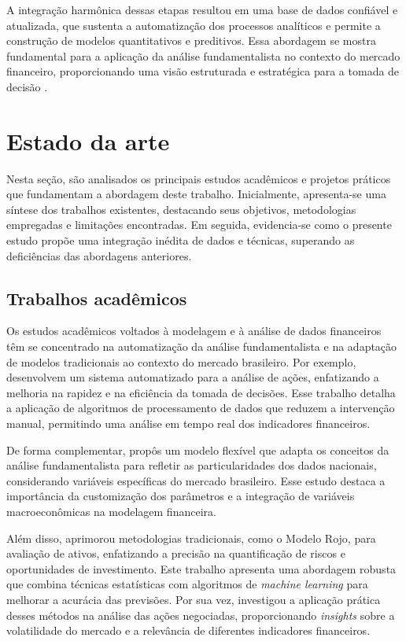 \documentclass[recuosum=1.5cm]{iftex2024}
\begin{document}
A integração harmônica dessas etapas resultou em uma base de dados confiável e atualizada, que sustenta a automatização dos processos analíticos e permite a construção de modelos quantitativos e preditivos. Essa abordagem se mostra fundamental para a aplicação da análise fundamentalista no contexto do mercado financeiro, proporcionando uma visão estruturada e estratégica para a tomada de decisão \cite{costa:2024:integraccao, halevy:2006:data}.

\section{Estado da arte} \label{sec:estado-arte}

Nesta seção, são analisados os principais estudos acadêmicos e projetos práticos que fundamentam a abordagem deste trabalho. Inicialmente, apresenta-se uma síntese dos trabalhos existentes, destacando seus objetivos, metodologias empregadas e limitações encontradas. Em seguida, evidencia-se como o presente estudo propõe uma integração inédita de dados e técnicas, superando as deficiências das abordagens anteriores.

\subsection{Trabalhos acadêmicos}

Os estudos acadêmicos voltados à modelagem e à análise de dados financeiros têm se concentrado na automatização da análise fundamentalista e na adaptação de modelos tradicionais ao contexto do mercado brasileiro. Por exemplo, \citet{montoia:2021:automatizaccao} desenvolvem um sistema automatizado para a análise de ações, enfatizando a melhoria na rapidez e na eficiência da tomada de decisões. Esse trabalho detalha a aplicação de algoritmos de processamento de dados que reduzem a intervenção manual, permitindo uma análise em tempo real dos indicadores financeiros.

De forma complementar, \citet{deAraujo:2021:modelo} propôs um modelo flexível que adapta os conceitos da análise fundamentalista para refletir as particularidades dos dados nacionais, considerando variáveis específicas do mercado brasileiro. Esse estudo destaca a importância da customização dos parâmetros e a integração de variáveis macroeconômicas na modelagem financeira.

Além disso, \citet{delalibera:2023:automatizaccao} aprimorou metodologias tradicionais, como o Modelo Rojo, para avaliação de ativos, enfatizando a precisão na quantificação de riscos e oportunidades de investimento. Este trabalho apresenta uma abordagem robusta que combina técnicas estatísticas com algoritmos de \textit{machine learning} para melhorar a acurácia das previsões. Por sua vez, \citet{reis:2020:analise} investigou a aplicação prática desses métodos na análise das ações negociadas, proporcionando \textit{insights} sobre a volatilidade do mercado e a relevância de diferentes indicadores financeiros.
\end{document}
